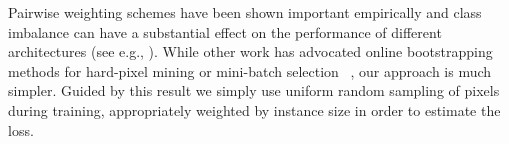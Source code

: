 Pairwise weighting schemes have been shown important empirically
\cite{fathi2017semantic} and class imbalance can have a substantial effect on
the performance of different architectures (see e.g., \cite{lin2017focal}).
While other work has advocated online bootstrapping methods for hard-pixel
mining or mini-batch selection ~\cite{loshchilov2015online, kong2016photo,
shrivastava2016training,wu2016bridging},
our approach is much simpler. Guided by
this result we simply use uniform random sampling of pixels during training,
appropriately weighted by instance size in order to estimate the loss.

